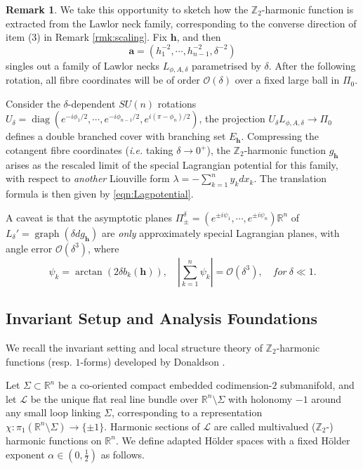 \documentclass[11pt,a4paper]{article}
\numberwithin{equation}{section}%
\theoremstyle{definition}
\newtheorem{rmk}[thm]{Remark}
\newcommand{\ie}{\emph{i.e.} }
\newcommand{\R}{\mathbb{R}}
\newcommand{\bmh}{\boldsymbol{h}}
\newcommand{\bma}{\boldsymbol{a}}
\newcommand{\Z}{\mathbb{Z}}
\begin{document}
\begin{rmk}
   We take this opportunity to sketch how the $\Z_{2}$-harmonic function is extracted from the Lawlor neck family, corresponding to the converse direction of item (3) in Remark \ref{rmk:scaling}. Fix $\bmh$, and then
   \[
        \bma=(h_1^{-2},\cdots,h_{n-1}^{-2},\delta^{-2})
   \]
   singles out a family of Lawlor necks $L_{\phi,A,\delta}$ parametrised by $\delta$. After the following rotation, all fibre coordinates will be of order $\mathcal{O}(\delta)$ over a fixed large ball in $\Pi_0$.
   
   Consider the $\delta$-dependent $SU(n)$ rotations $
        U_{\delta}
        =
        \operatorname{diag}
        (e^{-i\phi_1/2},\cdots,e^{-i\phi_{n-1}/2},e^{i(\pi-\phi_n)/2})$, the projection $U_\delta L_{\phi,A,\delta}\to \Pi_0$ defines a double branched cover with branching set $E_{\bmh}$. Compressing the cotangent fibre coordinates (\ie taking $\delta \to 0^+$), the $\Z_2$-harmonic function $g_{\bmh}$ arises as the rescaled limit of the special Lagrangian potential for this family, with respect to \textit{another} Liouville form
   $\lambda=-\sum\limits_{k=1}^ny_kdx_k$. The translation formula is then given by \eqref{eqn:Lagpotential}.
    
   A caveat is that the asymptotic planes
   $\Pi^\delta_\pm=(e^{\pm i\psi_1},\cdots,e^{\pm i\psi_n})\R^n$
   of $L_\delta'=\operatorname{graph}(\delta dg_{\bmh})$ are \textit{only} approximately special Lagrangian planes, with angle error $\mathcal{O}(\delta^3)$, where
   \[
        \psi_k=\operatorname{arctan}(2\delta b_k(\bmh)),
        \quad
        \left|\sum_{k=1}^{n} \psi_k\right|=\mathcal{O}(\delta^3),
        \quad
        \textit{for}~\delta\ll 1.
   \]
\end{rmk}

\subsection{Invariant Setup and Analysis Foundations}
We recall the invariant setting and local structure theory of $\Z_2$-harmonic functions (resp. $1$-forms) developed by Donaldson \cite{Donaldson-Deformation}.

Let $\Sigma \subset \R^n$ be a co-oriented compact embedded codimension-$2$ submanifold, and let $\mathcal{L}$ be the unique flat real line bundle over $\R^n\setminus \Sigma$ with holonomy $-1$ around any small loop linking $\Sigma$, corresponding to a representation
$\chi:\pi_1(\R^n\setminus \Sigma)\to \{\pm 1\}.$
Harmonic sections of $\mathcal{L}$ are called multivalued ($\Z_2$-) harmonic functions on $\R^n$. We define adapted H\"older spaces with a fixed H\"older exponent $\alpha\in (0,\frac{1}{2})$ as follows. 
\end{document}

